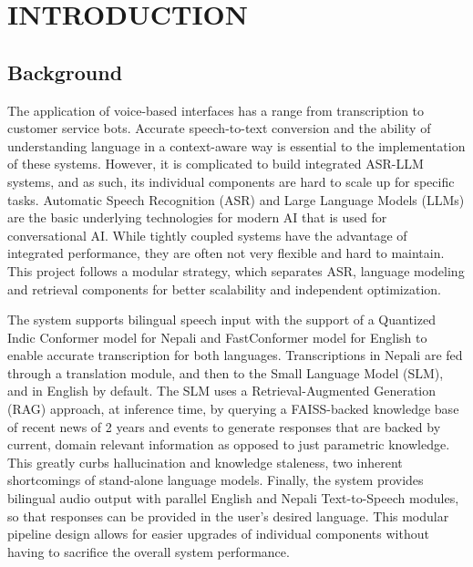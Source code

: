 \newpage
\section{\MakeUppercase{Introduction}}

\subsection{Background}
The application of voice-based interfaces has a range from transcription to customer service bots. Accurate speech-to-text conversion and the ability of understanding language in a context-aware way is essential to the implementation of these systems. However, it is complicated to build integrated ASR-LLM systems, and as such, its individual components are hard to scale up for specific tasks. Automatic Speech Recognition (ASR) and Large Language Models (LLMs) are the basic underlying technologies for modern AI that is used for conversational AI. While tightly coupled systems have the advantage of integrated performance, they are often not very flexible and hard to maintain. This project follows a modular strategy, which separates ASR, language modeling and retrieval components for better scalability and independent optimization.

The system supports bilingual speech input with the support of a Quantized Indic Conformer model for Nepali and FastConformer model for English to enable accurate transcription for both languages. Transcriptions in Nepali are fed through a translation module, and then to the Small Language Model (SLM), and in English by default. The SLM uses a Retrieval-Augmented Generation (RAG) approach, at inference time, by querying a FAISS-backed knowledge base of recent news of 2 years and events to generate responses that are backed by current, domain relevant information as opposed to just parametric knowledge. This greatly curbs hallucination and knowledge staleness, two inherent shortcomings of stand-alone language models. Finally, the system provides bilingual audio output with parallel English and Nepali Text-to-Speech modules, so that responses can be provided in the user's desired language. This modular pipeline design allows for easier upgrades of individual components without having to sacrifice the overall system performance.

